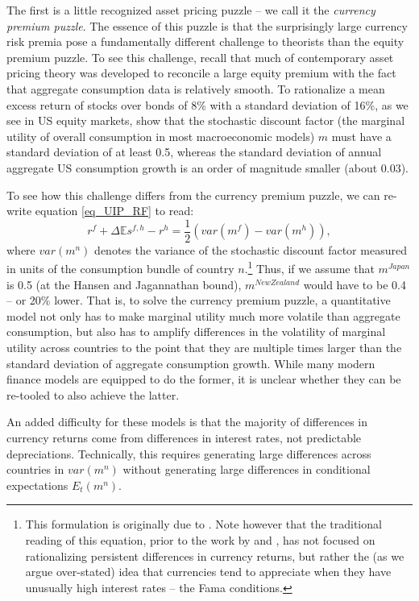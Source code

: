 \documentclass{ar-1col}
\begin{document}
The first is a little recognized asset pricing puzzle -- we call it the \textit{currency premium puzzle}. The essence of this puzzle is that the surprisingly large currency risk premia pose a fundamentally different challenge to theorists than the equity premium puzzle. To see this challenge, recall that much of contemporary asset pricing theory was developed to reconcile a large equity premium with the fact that aggregate consumption data is relatively smooth. To rationalize a mean excess return of stocks over bonds of 8\% with a standard deviation of 16\%, as we see in US equity markets, \citet{HansenJagannathan1991} show that the stochastic discount factor (the marginal utility of overall consumption in most macroeconomic models) $m$ must have a standard deviation of at least 0.5, whereas the standard deviation of annual aggregate US consumption growth is an order of magnitude smaller (about 0.03).  

To see how this challenge differs from the currency premium puzzle, we can re-write equation \ref{eq_UIP_RF} to read: 
\begin{equation}
  r^{f} + \Delta \mathbb{E} s^{f,h} - r^{h} 
  =\frac{1}{2}\left(var(m^f)-var(m^h)\right),
\end{equation} 
where $var(m^n)$ denotes the variance of the stochastic discount factor measured in units of the consumption bundle of country $n$.\footnote{This formulation is originally due to \cite{Backusetal2001}. Note however that the traditional reading of this equation, prior to the work by \cite{LustigRoussanovVerdelhan2011} and \cite{HassanMano2019}, has not focused on rationalizing persistent differences in currency returns, but rather the (as we argue over-stated) idea that currencies tend to appreciate when they have unusually high interest rates -- the Fama conditions.} Thus, if we assume that $m^{Japan}$ is 0.5 (at the Hansen and Jagannathan bound), $m^{New Zealand}$ would have to be 0.4 -- or 20\% lower. That is, to solve the currency premium puzzle, a quantitative model not only has to make marginal utility much more volatile than aggregate consumption, but also has to amplify differences in the volatility of marginal utility across countries to the point that they are multiple times larger than the standard deviation of aggregate consumption growth. While many modern finance models are equipped to do the former, it is unclear whether they can be re-tooled to also achieve the latter. 

An added difficulty for these models is that the majority of differences in currency returns come from differences in interest rates, not predictable depreciations. Technically, this requires generating large differences across countries in $var(m^n)$ without generating large differences in conditional expectations $E_t(m^n)$. 
\end{document}
